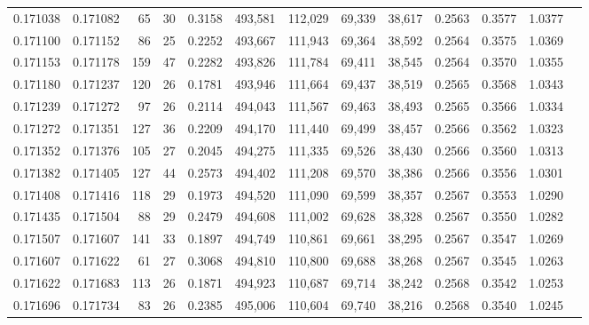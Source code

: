 \begin{tabular}{rrrrrrrrrrrrr}
0.171038 & 0.171082 &    65 &  30 &                                     0.3158 & 493,581 & 112,029 &  69,339 &  38,617 & 0.2563 & 0.3577 & 1.0377 \\
0.171100 & 0.171152 &    86 &  25 &                                     0.2252 & 493,667 & 111,943 &  69,364 &  38,592 & 0.2564 & 0.3575 & 1.0369 \\
0.171153 & 0.171178 &   159 &  47 &                                     0.2282 & 493,826 & 111,784 &  69,411 &  38,545 & 0.2564 & 0.3570 & 1.0355 \\
0.171180 & 0.171237 &   120 &  26 &                                     0.1781 & 493,946 & 111,664 &  69,437 &  38,519 & 0.2565 & 0.3568 & 1.0343 \\
0.171239 & 0.171272 &    97 &  26 &                                     0.2114 & 494,043 & 111,567 &  69,463 &  38,493 & 0.2565 & 0.3566 & 1.0334 \\
0.171272 & 0.171351 &   127 &  36 &                                     0.2209 & 494,170 & 111,440 &  69,499 &  38,457 & 0.2566 & 0.3562 & 1.0323 \\
0.171352 & 0.171376 &   105 &  27 &                                     0.2045 & 494,275 & 111,335 &  69,526 &  38,430 & 0.2566 & 0.3560 & 1.0313 \\
0.171382 & 0.171405 &   127 &  44 &                                     0.2573 & 494,402 & 111,208 &  69,570 &  38,386 & 0.2566 & 0.3556 & 1.0301 \\
0.171408 & 0.171416 &   118 &  29 &                                     0.1973 & 494,520 & 111,090 &  69,599 &  38,357 & 0.2567 & 0.3553 & 1.0290 \\
0.171435 & 0.171504 &    88 &  29 &                                     0.2479 & 494,608 & 111,002 &  69,628 &  38,328 & 0.2567 & 0.3550 & 1.0282 \\
0.171507 & 0.171607 &   141 &  33 &                                     0.1897 & 494,749 & 110,861 &  69,661 &  38,295 & 0.2567 & 0.3547 & 1.0269 \\
0.171607 & 0.171622 &    61 &  27 &                                     0.3068 & 494,810 & 110,800 &  69,688 &  38,268 & 0.2567 & 0.3545 & 1.0263 \\
0.171622 & 0.171683 &   113 &  26 &                                     0.1871 & 494,923 & 110,687 &  69,714 &  38,242 & 0.2568 & 0.3542 & 1.0253 \\
0.171696 & 0.171734 &    83 &  26 &                                     0.2385 & 495,006 & 110,604 &  69,740 &  38,216 & 0.2568 & 0.3540 & 1.0245 \\

\end{tabular}
